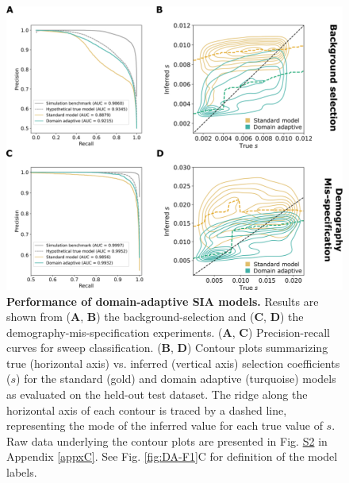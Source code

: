 \begin{figure}
    \centering
    \includegraphics[width=\textwidth]{DA_figs/DA_F3.PNG}
    \caption[Performance of domain-adaptive \ac{SIA} models.]{\textbf{Performance of domain-adaptive \ac{SIA} models.} Results are shown from (\textbf{A}, \textbf{B}) the background-selection and (\textbf{C}, \textbf{D}) the demography-mis-specification experiments. (\textbf{A}, \textbf{C}) Precision-recall curves for sweep classification. (\textbf{B}, \textbf{D}) Contour plots summarizing true (horizontal axis) vs. inferred (vertical axis) selection coefficients ($s$) for the standard (gold) and domain adaptive (turquoise) models as evaluated on the held-out test dataset. The ridge along the horizontal axis of each contour is traced by a dashed line, representing the mode of the inferred value for each true value of $s$. Raw data underlying the contour plots are presented in Fig. \href{https://journals.plos.org/plosgenetics/article?id=10.1371/journal.pgen.1011032\#sec018}{S2} in Appendix \ref{appxC}. See Fig. \ref{fig:DA-F1}C for definition of the model labels.}
    \label{fig:DA-F3}
\end{figure}

